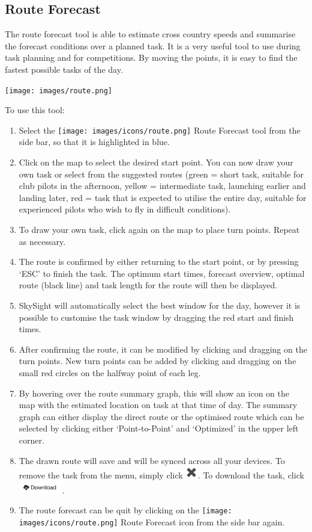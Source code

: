 \documentclass[11pt,a4paper]{article}
\begin{document}
\subsection{Route Forecast}\label{subsec:routeforecast}
The route forecast tool is able to estimate cross country speeds and summarise the forecast conditions over a planned task. It is a very useful tool to use during task planning and for competitions. By moving the points, it is easy to find the fastest possible tasks of the day.
\begin{center}
\texttt{[image: images/route.png]}
\end{center}

To use this tool:
\begin{enumerate}
\item Select the \texttt{[image: images/icons/route.png]} Route Forecast tool from the side bar, so that it is highlighted in blue.
\item Click on the map to select the desired start point. You can now draw your own task or select from the suggested routes (green = short task, suitable for club pilots in the afternoon, yellow = intermediate task, launching earlier and landing later, red = task that is expected to utilise the entire day, suitable for experienced pilots who wish to fly in difficult conditions).
\item To draw your own task, click again on the map to place turn points. Repeat as necessary.
\item The route is confirmed by either returning to the start point, or by pressing `ESC' to finish the task. The optimum start times, forecast overview, optimal route (black line) and task length for the route will then be displayed.
\item SkySight will automatically select the best window for the day, however it is possible to customise the task window by dragging the red start and finish times.
\item After confirming the route, it can be modified by clicking and dragging on the turn points. New turn points can be added by clicking and dragging on the small red circles on the halfway point of each leg.
\item By hovering over the route summary graph, this will show an icon on the map with the estimated location on task at that time of day. The summary graph can either display the direct route or the optimised route which can be selected by clicking either `Point-to-Point' and `Optimized' in the upper left corner.
\item The drawn route will save and will be synced across all your devices. To remove the task from the menu, simply click \includegraphics[height=15pt]{images/icons/x.png}. To download the task, click \includegraphics[height=15pt]{images/icons/download.png}. 
\item The route forecast can be quit by clicking on the \texttt{[image: images/icons/route.png]} Route Forecast icon from the side bar again.
\end{enumerate}
\end{document}
